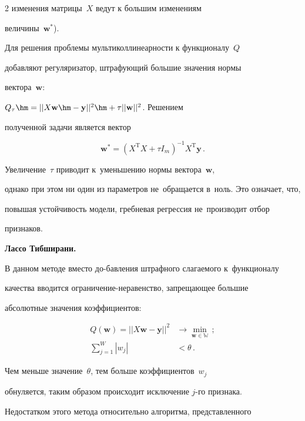 \begin{multicols}{2}
изменения матрицы~$X$ ведут к большим изменениям

величины~$\mathbf{w}^{*}$).



Для решения проблемы мультиколлинеарности к функционалу~$Q$

добавляют регуляризатор, штрафующий большие значения нормы

вектора~$\mathbf{w}$:

$Q_\tau\hm=||X\mathbf{w}\hm-\mathbf{y}||^2\hm+\tau||\mathbf{w}||^2$. Решением

полученной задачи является вектор

$$

\mathbf{w}^{*}=\left(X^{\mathrm{T}}X+\tau I_m\right)^{-1}X^{\mathrm{T}}\mathbf{y}\,.

$$



Увеличение~$\tau$ приводит к~уменьшению нормы вектора~$\mathbf{w}$,

однако при этом ни один из параметров не~обращается в~ноль. Это означает, что,

повышая устойчивость модели, гребневая регрессия не~производит отбор

признаков.



\smallskip



\textbf{Лассо Тибширани.}

В данном методе вместо до-\linebreak бав\-ле\-ния штрафного слагаемого к~функционалу

качест\-ва вводится ограничение-неравенство, запрещающее большие

абсолютные значения коэффициентов:

\begin{align*}

Q(\mathbf{w})=||X\mathbf{w}-\mathbf{y}||^2 &\rightarrow \min\limits_\mathbf{w\in\mathbb{W}}\,;\\[9pt]

\sum\limits_{j=1}^W |w_j|&<\theta\,.

\end{align*}



Чем меньше значение~$\theta$, тем больше коэффициентов~$w_j$

обнуляется, таким образом происходит исключение $j$-го признака.

Недостатком этого метода относительно алгоритма, представленного


\end{multicols}
